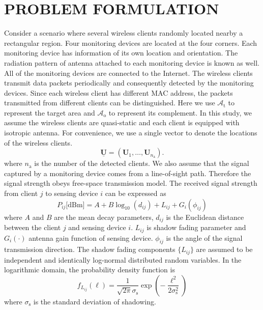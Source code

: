 \chapter{PROBLEM FORMULATION}
Consider a scenario where several wireless clients randomly located nearby a rectangular region. Four monitoring devices are located at the four corners. Each monitoring device has information of its own location and orientation. The radiation pattern of antenna attached to each monitoring device is known as well. All of the monitoring devices are connected to the Internet. The wireless clients transmit data packets periodically and consequently detected by the monitoring devices. Since each wireless client has different MAC address, the packets transmitted from different clients can be distinguished. Here we use $\mathcal{A}_{\mathrm{t}}$ to represent the target area and $\mathcal{A}_{\mathrm{o}}$ to represent its complement.
In this study, we assume the wireless clients are quasi-static and each client is equipped with isotropic antenna. For convenience, we use a single vector to denote the locations of the wireless clients.
\begin{equation}
\underline{\mathbf{U}} = (\mathbf{U}_1, \ldots, \mathbf{U}_{n_{\mathrm{a}}}).
\end{equation}
where $n_{\mathrm{a}}$ is the number of the detected clients.
We also assume that the signal captured by a monitoring device comes from a line-of-sight path. Therefore the signal strength obeys free-space transmission model. The received signal strength from client $j$ to sensing device $i$ can be expressed as
\begin{equation} 
P_{ij} \text{[dBm]}
= A + B \log_{10}(d_{ij}) + L_{ij} + G_i (\phi_{ij})
\end{equation}
where $A$ and $B$ are the mean decay parameters, $d_{ij}$ is the Euclidean distance between the client $j$ and sensing device $i$. $L_{ij}$ is shadow fading parameter and $G_i (\cdot)$ antenna gain function of sensing device. $\phi_{ij}$ is the angle of the signal transmission direction.
The shadow fading components $\{ L_{ij} \}$ are assumed to be independent and identically log-normal distributed random variables. In the logarithmic domain, the probability density function is
\begin{equation} 
f_{L_{ij}} (\ell)
= \frac{1}{\sqrt{2 \pi} \sigma_{\mathrm{s}}} 
\exp \left( - \frac{\ell^2}{2 \sigma_{\mathrm{s}}^2} \right)
\end{equation}
where $\sigma_{\mathrm{s}}$ is the standard deviation of shadowing.
